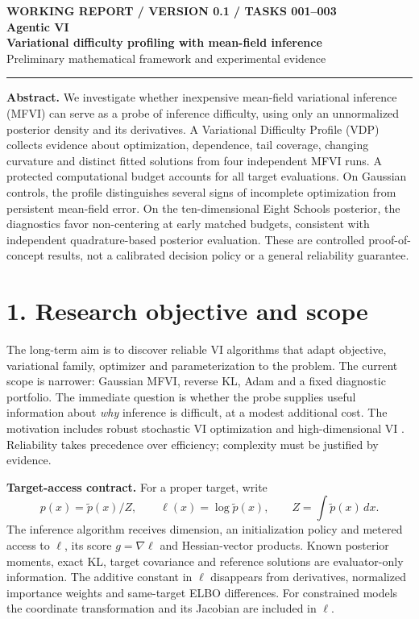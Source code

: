 \documentclass[11pt,a4paper]{article}
\begin{document}
\thispagestyle{fancy}
{\small\bfseries\textcolor{muted}{WORKING REPORT \enspace / \enspace VERSION 0.1 \enspace / \enspace TASKS 001--003}}\\[4pt]
{\Huge\bfseries\textcolor{ink}{Agentic VI}}\\[5pt]
{\LARGE\bfseries Variational difficulty profiling with mean-field inference}\\[4pt]
{\large Preliminary mathematical framework and experimental evidence}\par
\vspace{2mm}\hrule\vspace{3mm}
\textbf{Abstract.} We investigate whether inexpensive mean-field variational inference (MFVI) can serve as a probe of inference difficulty, using only an unnormalized posterior density and its derivatives. A Variational Difficulty Profile (VDP) collects evidence about optimization, dependence, tail coverage, changing curvature and distinct fitted solutions from four independent MFVI runs. A protected computational budget accounts for all target evaluations. On Gaussian controls, the profile distinguishes several signs of incomplete optimization from persistent mean-field error. On the ten-dimensional Eight Schools posterior, the diagnostics favor non-centering at early matched budgets, consistent with independent quadrature-based posterior evaluation. These are controlled proof-of-concept results, not a calibrated decision policy or a general reliability guarantee.

\section*{1. Research objective and scope}
The long-term aim is to discover reliable VI algorithms that adapt objective, variational family, optimizer and parameterization to the problem. The current scope is narrower: Gaussian MFVI, reverse KL, Adam and a fixed diagnostic portfolio. The immediate question is whether the probe supplies useful information about \emph{why} inference is difficult, at a modest additional cost. The motivation includes robust stochastic VI optimization and high-dimensional VI \cite{dhaka20,dhaka21}. Reliability takes precedence over efficiency; complexity must be justified by evidence.

\textbf{Target-access contract.} For a proper target, write
\[p(x)=\tilde p(x)/Z,\qquad \ell(x)=\log\tilde p(x),\qquad Z=\int \tilde p(x)\,dx.\]
The inference algorithm receives dimension, an initialization policy and metered access to $\ell$, its score $g=\nabla\ell$ and Hessian-vector products. Known posterior moments, exact KL, target covariance and reference solutions are evaluator-only information. The additive constant in $\ell$ disappears from derivatives, normalized importance weights and same-target ELBO differences. For constrained models the coordinate transformation and its Jacobian are included in $\ell$.
\end{document}
